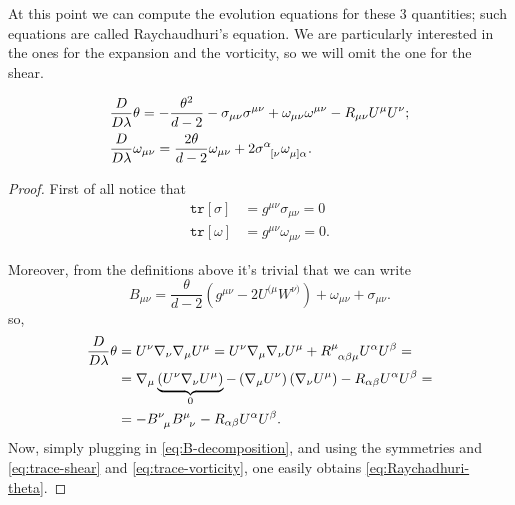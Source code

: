 	At this point we can compute the evolution equations for these \(3\) quantities; such equations are called Raychaudhuri's equation.
	We are particularly interested in the ones for the expansion and the vorticity, so we will omit the one for the shear.
	
	\begin{align}
		\label{eq:Raychadhuri-theta}
		&\frac{D}{D\lambda}\theta = -\frac{\theta^2}{d - 2} - \sigma_{\mu\nu}\sigma^{\mu\nu} + \omega_{\mu\nu}\omega^{\mu\nu}  - R_{\mu\nu}U^{\mu}U^{\nu}; \\
		\label{eq:Raychadhuri-vorticity}
		&\frac{D}{D\lambda}\omega_{\mu\nu} = \frac{2\theta}{d - 2}\omega_{\mu\nu} + 2\sigma\indices{^{\alpha}_{[\nu}}\omega\indices{_{\mu]\alpha}}.
	\end{align}
	
	\begin{proof}
		First of all notice that 
		\begin{align}
			\label{eq:trace-shear}
			\texttt{tr}[\sigma] &= g^{\mu\nu}\sigma_{\mu\nu} = 0\\
			\label{eq:trace-vorticity}
			\texttt{tr}[\omega] &= g^{\mu\nu}\omega_{\mu\nu} = 0.
		\end{align}
		
		Moreover, from the definitions above it's trivial that we can write
		\begin{equation}
		\label{eq:B-decomposition}
			B_{\mu\nu} = \frac{\theta}{d - 2} \left(g^{\mu\nu} - 2U^{(\mu}W^{\nu)}\right) +\omega_{\mu\nu} + \sigma_{\mu\nu}.
		\end{equation}
		so,
		\begin{align*}
			\frac{D}{D\lambda}\theta &= U^{\nu}\nabla_{\nu}\nabla_{\mu}U^{\mu} = U^{\nu}\nabla_{\mu}\nabla_{\nu}U^{\mu} + R\indices{^{\mu}_{\alpha\beta\mu}}U^{\alpha}U^{\beta} =\\
			&= \nabla_{\mu}\underbrace{\left(U^{\nu}\nabla_{\nu}U^{\mu}\right)}_{0} - \left(\nabla_{\mu}U^{\nu}\right)\left(\nabla_{\nu}U^{\mu}\right) - R_{\alpha\beta}U^{\alpha}U^{\beta} =\\
			&= - B\indices{^{\nu}_{\mu}}B\indices{^{\mu}_{\nu}} - R_{\alpha\beta}U^{\alpha}U^{\beta}.
		\end{align*}
		Now, simply plugging in \eqref{eq:B-decomposition}, and using the symmetries and \eqref{eq:trace-shear} and \eqref{eq:trace-vorticity}, one easily obtains \eqref{eq:Raychadhuri-theta}.
		

\end{proof}
